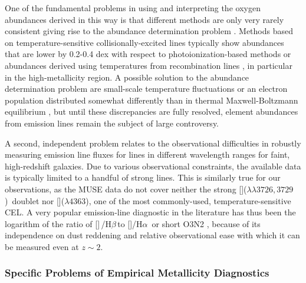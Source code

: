\documentclass[traditabstract]{aa}
\newcommand{\hb}{H$\beta$}
\newcommand{\ha}{H$\alpha$}
\newcommand{\oii}{[\ion{O}{ii}]}
\newcommand{\oiii}{[\ion{O}{iii}]}
\newcommand{\nii}{[\ion{N}{ii}]}
\begin{document}
One of the fundamental problems in using and interpreting the oxygen abundances derived in this way is that different methods are only very rarely consistent \citep[e.g.][]{2008ApJ...681.1183K} giving rise to the abundance determination problem \citep{1967ApJ...150..825P}. Methods based on temperature-sensitive collisionally-excited lines typically show abundances that are lower by 0.2-0.4 dex with respect to photoionization-based methods or abundances derived using temperatures from recombination lines \citep[e.g.][and references therein]{2012MNRAS.426.2630L}, in particular in the high-metallicity region. A possible solution to the abundance determination problem are small-scale temperature fluctuations \citep[e.g.][]{2003ApJ...584..735P, 2004MNRAS.355..229E} or an electron population distributed somewhat differently than in thermal Maxwell-Boltzmann equilibrium \citep{2012ApJ...752..148N, 2012MNRAS.426.2630L}, but until these discrepancies are fully resolved, element abundances from emission lines remain the subject of large controversy.

A second, independent problem relates to the observational difficulties in robustly measuring emission line fluxes for lines in different wavelength ranges for faint, high-redshift galaxies. Due to various observational constraints, the available data is typically limited to a handful of strong lines. This is similarly true for our observations, as the MUSE data do not cover neither the strong \oii($\lambda\lambda3726,3729$)~doublet nor \oiii($\lambda 4363$), one of the most commonly-used, temperature-sensitive CEL. A very popular emission-line diagnostic in the literature has thus been the logarithm of the ratio of \oiii\,/\hb\,to \nii/\ha\, or short O3N2 \citep[e.g.][]{2004MNRAS.348L..59P, 2013A&A...559A.114M}, because of its independence on dust reddening and relative observational ease with which it can be measured even at $z\sim 2$.

\subsubsection{Specific Problems of Empirical Metallicity Diagnostics}
\end{document}
